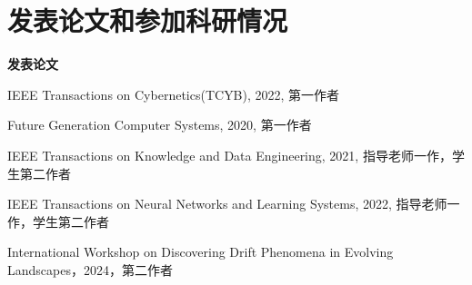 

\chapter*{发表论文和参加科研情况}
%
%
%
%
%
%
\setlength{\parindent}{0em}
\textbf{发表论文}
\begin{publist}
    \item IEEE Transactions on Cybernetics(TCYB), 2022, 第一作者
    \item Future Generation Computer Systems, 2020, 第一作者
    \item IEEE Transactions on Knowledge and Data Engineering, 2021, 指导老师一作，学生第二作者
    \item IEEE Transactions on Neural Networks and Learning Systems, 2022, 指导老师一作，学生第二作者
    \item International Workshop on Discovering Drift Phenomena in Evolving Landscapes，2024，第二作者
\end{publist}

